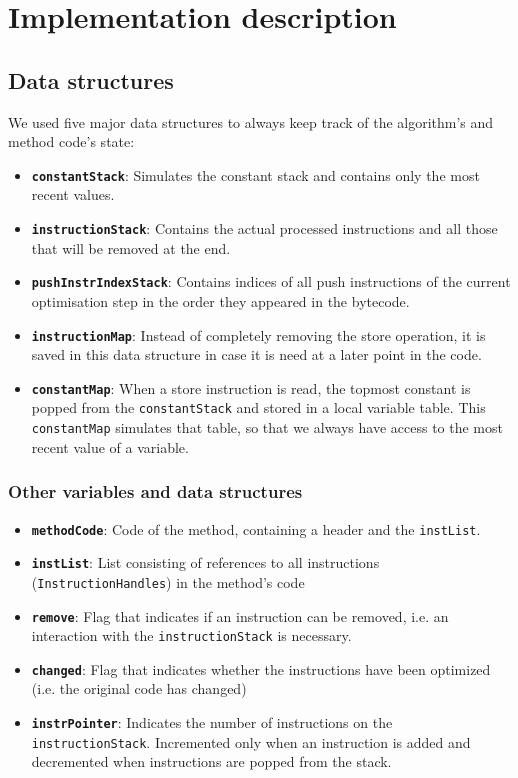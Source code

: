 \section{Implementation description}

\subsection{Data structures}
We used five major data structures to always keep track of the algorithm's and method code's state:

\begin{itemize}
\item \textbf{\texttt{constantStack}}: Simulates the constant stack and contains only the most recent values.
\item \textbf{\texttt{instructionStack}}: Contains the actual processed instructions and all those that will be removed at the end.
\item \textbf{\texttt{pushInstrIndexStack}}: Contains indices of all push instructions of the current optimisation step in the order they appeared in the bytecode.
\item \textbf{\texttt{instructionMap}}: Instead of completely removing the store operation, it is saved in this data structure in case it is need at a later point in the code.
\item \textbf{\texttt{constantMap}}: When a store instruction is read, the topmost constant is popped from the \texttt{\texttt{constantStack}} and stored in a local variable table. This \texttt{constantMap} simulates that table, so that we always have access to the most recent value of a variable.
\end{itemize}

\subsubsection{Other variables and data structures}
\begin{itemize}
\item \textbf{\texttt{methodCode}}: Code of the method, containing a header and the \texttt{instList}.
\item \textbf{\texttt{instList}}: List consisting of references to all instructions (\texttt{InstructionHandles}) in the method's code
\item \textbf{\texttt{remove}}: Flag that indicates if an instruction can be removed, i.e. an interaction with the \texttt{instructionStack} is necessary.
\item \textbf{\texttt{changed}}: Flag that indicates whether the instructions have been optimized (i.e. the original code has changed) 
\item \textbf{\texttt{instrPointer}}: Indicates the number of instructions on the \texttt{instructionStack}. Incremented only when an instruction is added and decremented when instructions are popped from the stack.
\end{itemize}

